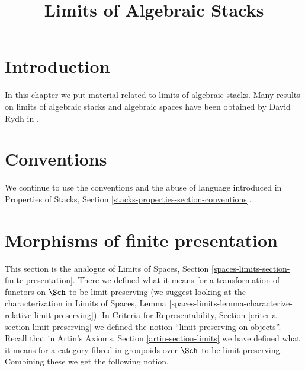 

%


\title{Limits of Algebraic Stacks}


\maketitle

\label{section-phantom}

\tableofcontents

\section{Introduction}
\label{section-introduction}

\noindent
In this chapter we put material related to limits of algebraic stacks.
Many results on limits of algebraic stacks and algebraic spaces
have been obtained by David Rydh in \cite{rydh_approx}.


\section{Conventions}
\label{section-conventions}

\noindent
We continue to use the conventions and the abuse of language
introduced in
Properties of Stacks, Section \ref{stacks-properties-section-conventions}.







\section{Morphisms of finite presentation}
\label{section-finite-presentation}

\noindent
This section is the analogue of Limits of Spaces, Section
\ref{spaces-limits-section-finite-presentation}.
There we defined what it means for a transformation of functors
on $\Sch$ to be limit preserving (we suggest looking at the
characterization in Limits of Spaces, Lemma
\ref{spaces-limits-lemma-characterize-relative-limit-preserving}).
In Criteria for Representability, Section
\ref{criteria-section-limit-preserving}
we defined the notion ``limit preserving on objects''.
Recall that in Artin's Axioms, Section \ref{artin-section-limits}
we have defined what it means for a category fibred in groupoids
over $\Sch$ to be limit preserving. Combining these we get
the following notion.

